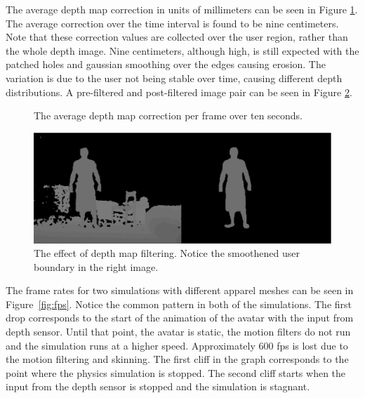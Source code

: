 \documentclass[number,preprint,review,12pt]{elsarticle}
\begin{document}
{\color{red}
The average depth map correction in units of millimeters can be seen in Figure \ref{fig:depth_graph}. The average correction over the time interval is found to be nine centimeters. Note that these correction values are collected over the user region, rather than the whole depth image. Nine centimeters, although high, is still expected with the patched holes and gaussian smoothing over the edges causing erosion. The variation is due to the user not being stable over time, causing different depth distributions. A pre-filtered and post-filtered image pair can be seen in Figure \ref{fig:depth_figure}. 

\begin{figure}[htbp]
{\color{red}
	\begin{center} 
	\end{center}
	\caption{The average depth map correction per frame over ten seconds. }
	\label{fig:depth_graph}
}
\end{figure}

\begin{figure}[htbp]
{\color{red}
	\begin{center} 
	\includegraphics[width=1.0\textwidth]{./depth_comparison.eps}
	\end{center}
	\caption{The effect of depth map filtering. Notice the smoothened user boundary in the right image. }
	\label{fig:depth_figure}
}
\end{figure}
}

{\color{red}
The frame rates for two simulations with different apparel meshes can be seen in Figure~\ref{fig:fps}. Notice the common pattern in both of the simulations. The first drop corresponds to the start of the animation of the avatar with the input from depth sensor. Until that point, the avatar is static, the motion filters do not run and the simulation runs at a higher speed. Approximately 600 fps is lost due to the motion filtering and skinning. The first cliff in the graph corresponds to the point where the physics simulation is stopped. The second cliff starts when the input from the depth sensor is stopped and the simulation is stagnant.  
}
\end{document}

